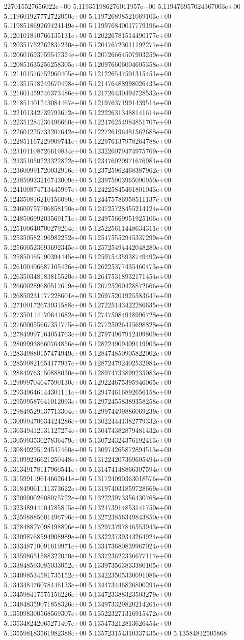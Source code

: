 227015527656022e+00	5.119351986276011957e+00	5.119476957024367003e+00	5.119601927772722050e+00	5.119726898521069103e+00	5.119851869269424149e+00	5.119976840017779196e+00	5.120101810766135131e+00	5.120226781514490177e+00	5.120351752262837230e+00	5.120476723011192277e+00	5.120601693759547324e+00	5.120726664507903259e+00	5.120851635256258305e+00	5.120976606004605358e+00	5.121101576752960405e+00	5.121226547501315451e+00	5.121351518249670498e+00	5.121476488998026433e+00	5.121601459746373486e+00	5.121726430494728532e+00	5.121851401243084467e+00	5.121976371991439514e+00	5.122101342739793672e+00	5.122226313488141614e+00	5.122351284236496660e+00	5.122476254984851707e+00	5.122601225733207642e+00	5.122726196481562688e+00	5.122851167229909741e+00	5.122976137978264788e+00	5.123101108726619834e+00	5.123226079474975769e+00	5.123351050223322822e+00	5.123476020971676981e+00	5.123600991720032916e+00	5.123725962468387962e+00	5.123850933216743009e+00	5.123975903965090950e+00	5.124100874713445997e+00	5.124225845461801043e+00	5.124350816210156090e+00	5.124475786958511137e+00	5.124600757706858190e+00	5.124725728455214124e+00	5.124850699203569171e+00	5.124975669951925106e+00	5.125100640700279264e+00	5.125225611448634311e+00	5.125350582196982252e+00	5.125475552945337299e+00	5.125600523693692345e+00	5.125725494442048280e+00	5.125850465190394445e+00	5.125975435938749492e+00	5.126100406687105426e+00	5.126225377435460473e+00	5.126350348183815520e+00	5.126475318932171454e+00	5.126600289680517619e+00	5.126725260428872666e+00	5.126850231177228601e+00	5.126975201925583647e+00	5.127100172673931588e+00	5.127225143422286635e+00	5.127350114170641682e+00	5.127475084918996728e+00	5.127600055667351775e+00	5.127725026415698828e+00	5.127849997164054763e+00	5.127974967912409809e+00	5.128099938660764856e+00	5.128224909409119903e+00	5.128349880157474949e+00	5.128474850905822002e+00	5.128599821654177937e+00	5.128724792402532984e+00	5.128849763150888030e+00	5.128974733899235083e+00	5.129099704647590130e+00	5.129224675395946065e+00	5.129349646144301111e+00	5.129474616892656158e+00	5.129599587641012093e+00	5.129724558389358258e+00	5.129849529137713304e+00	5.129974499886069239e+00	5.130099470634424286e+00	5.130224441382779332e+00	5.130349412131127274e+00	5.130474382879481432e+00	5.130599353627836479e+00	5.130724324376192413e+00	5.130849295124547460e+00	5.130974265872894513e+00	5.131099236621250448e+00	5.131224207369605494e+00	5.131349178117960541e+00	5.131474148866307594e+00	5.131599119614662641e+00	5.131724090363018576e+00	5.131849061111373622e+00	5.131974031859728669e+00	5.132099002608075722e+00	5.132223973356430768e+00	5.132348944104785815e+00	5.132473914853141750e+00	5.132598885601496796e+00	5.132723856349843850e+00	5.132848827098198896e+00	5.132973797846553943e+00	5.133098768594908989e+00	5.133223739343264924e+00	5.133348710091619971e+00	5.133473680839967024e+00	5.133598651588322070e+00	5.133723622336677117e+00	5.133848593085033052e+00	5.133973563833380105e+00	5.134098534581735152e+00	5.134223505330091086e+00	5.134348476078446133e+00	5.134473446826800291e+00	5.134598417575156226e+00	5.134723388323503279e+00	5.134848359071858326e+00	5.134973329820214261e+00	5.135098300568569307e+00	5.135223271316915472e+00	5.135348242065271407e+00	5.135473212813626454e+00	5.135598183561982388e+00	5.135723154310337435e+00	5.13584812505868